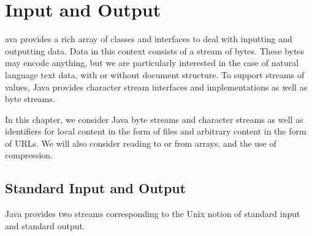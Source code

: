 \chapter{Input and Output}\label{chap:io}

ava provides a rich array of classes and interfaces to
deal with inputting and outputting data.  Data in this context
consists of a stream of bytes. These bytes may encode anything, but
we are particularly interested in the case of natural language text
data, with or without document structure.  To support streams of
 values, Java provides character stream interfaces
and implementations as well as byte streams.  

In this chapter, we consider Java byte streams and
character streams as well as identifiers for local content in
the form of files and arbitrary content in the form of URLs.  We
will also consider reading to or from arrays, and 
the use of compression.


\section{Standard Input and Output}\label{section:stdin-stdout}

Java provides two streams corresponding to the Unix notion of standard
input and standard output.






